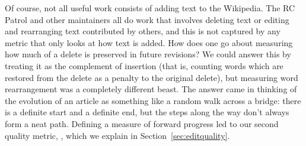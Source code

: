 Of course, not all useful work consists of adding text to the Wikipedia.
The RC Patrol and other maintainers all do work that involves
deleting text or editing and rearranging text contributed by others,
and this is not captured by any metric that only looks at how text is added.
How does one go about measuring how much of a delete is preserved
in future revisions?
We could answer this by treating it as the complement of insertion
(that is, counting words which are restored from the delete as a
penalty to the original delete), but measuring word rearrangement
was a completely different beast.
The answer came in thinking of the evolution of an article as something
like a random walk across a bridge: there is a definite start and a
definite end, but the steps along the way don't always form a neat path.
Defining a measure of forward progress led to our second
quality metric, , which we explain in
Section~\ref{sec:editquality}.


